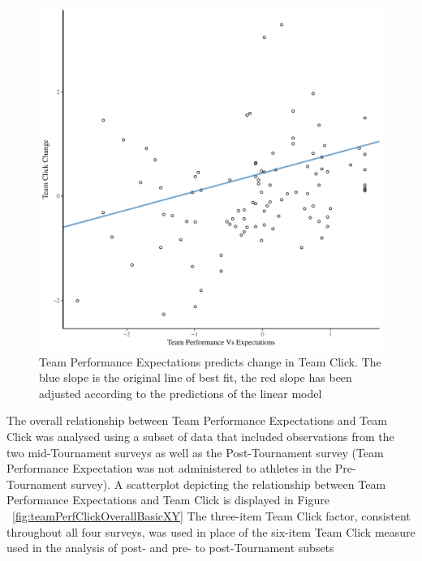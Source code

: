 \begin{CJK}{UTF8}{gbsn}

    
    


    \begin{figure}[htbp]
      \centering
    \includegraphics[scale=.5]{images/teamPerfClickDeltaModelSlope.pdf}
      \caption{Team Performance Expectations predicts change in Team Click. The blue slope is the original line of best fit, the red slope has been adjusted according to the predictions of the linear model}
      \label{fig:teamPerfClickDeltaModelSlope}
    \end{figure}




The overall relationship between Team Performance Expectations and Team Click was analysed using a subset of data that included observations from the two mid-Tournament surveys as well as the Post-Tournament survey (Team Performance Expectation was not administered to athletes in the Pre-Tournament survey).  A scatterplot depicting the relationship between Team Performance Expectations and Team Click is displayed in Figure ~\ref{fig:teamPerfClickOverallBasicXY} The three-item Team Click factor, consistent throughout all four surveys, was used in place of the six-item Team Click measure used in the analysis of post- and pre- to post-Tournament subsets


\end{CJK}
